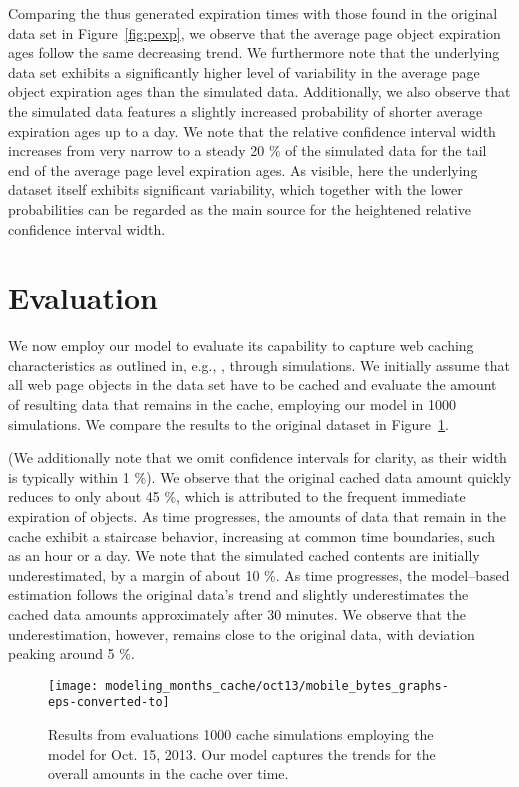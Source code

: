 Comparing the thus generated expiration times with those found in the original data set in Figure~\ref{fig:pexp}, we observe that the average page object expiration ages follow the same decreasing trend.
We furthermore note that the underlying data set exhibits a significantly higher level of variability in the average page object expiration ages than the simulated data. 
Additionally, we also observe that the simulated data features a slightly increased probability of shorter average expiration ages up to a day.
We note that the relative confidence interval width increases from very narrow to a steady 20 \% of the simulated data 
for the tail end of the average page level expiration ages. 
As visible, here the underlying dataset itself exhibits significant variability, which together with the lower probabilities can be regarded as the main source for the heightened relative confidence interval width.

\section{Evaluation}
\label{s:eval}
We now employ our model to evaluate its capability to capture web caching characteristics as outlined in, e.g., \cite{JoSe14GreenComm}, through simulations.
We initially assume that all web page objects in the data set have to be cached and evaluate the amount of resulting data that remains in the cache, employing our model in 1000 simulations. 
We compare the results to the original dataset in Figure~\ref{fig:simoct13}.  

(We additionally note that we omit confidence intervals for clarity, as their width is typically within 1 \%).
We observe that the original cached data amount quickly reduces to only about 45 \%, which is attributed to the frequent immediate expiration of objects.
As time progresses, the amounts of data that remain in the cache exhibit a staircase behavior, increasing at common time boundaries, such as an hour or a day.
We note that the simulated cached contents are initially underestimated, by a margin of about 10 \%. 
As time progresses, the model--based estimation follows the original data's trend and slightly underestimates the cached data amounts approximately after 30 minutes.
We observe that the underestimation, however, remains close to the original data, with deviation peaking around 5 \%.

\begin{figure}
	\centering
	\texttt{[image: modeling\_months\_cache/oct13/mobile\_bytes\_graphs-eps-converted-to]}
	\caption{Results from evaluations 1000 cache simulations employing the model for Oct. 15, 2013. Our model captures the trends for the overall amounts in the cache over time.\label{fig:simoct13}}
\end{figure}

